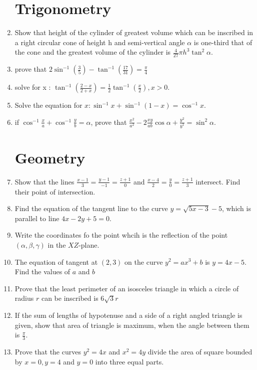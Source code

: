\documentclass[12pt,-letter paper]{article}
\theoremstyle{remark}
\providecommand{\brak}[1]{\ensuremath{\left(#1\right)}}
\begin{document}
\begin{enumerate}
            \section{Trigonometry}
      \item Show that height of the cylinder of greatest volume which can be inscribed in a right circular cone of height h and semi-vertical angle $\alpha$ is one-third that of the cone and the greatest volume of the cylinder is $\frac{4}{27} \pi h^3 \tan^2 \alpha$.
      \item prove that $2\sin^{-1}\brak{\frac{3}{5}}-\tan^{-1}\brak{\frac{17}{31}}=\frac{\pi}{4}$
      \item solve for x : $\tan^{-1}\brak{\frac{2-x}{2+x}}=\frac{1}{2} \tan^{-1}\brak{\frac{x}{2}},x>0$.

      \item Solve the equation for $x: \sin^{-1} x + \sin^{-1}\brak{1-x} = \cos^{-1}x$.
      \item if $\cos^{-1}\frac{x}{a} + \cos^{-1}\frac{y}{b} = \alpha$, prove that $\frac{x^2}{a^2} -2\frac{xy}{ab}\cos \alpha + \frac{y^2}{b^2} = \sin^2 \alpha$.
            \section{Geometry}
      \item Show that the lines $\frac{x-1}{3}= \frac{y-1}{-1} = \frac{z+1}{0}$ and $\frac{x-4}{2}= \frac{y}{0} = \frac{z+1}{3}$ intersect. Find their point of intersection.
      \item Find the equation of the tangent line to the curve $y=\sqrt{5x-3} -5$, which is parallel to line $4x-2y+5=0$.
      \item Write the coordinates fo the point whcih is the reflection of the point \brak{\alpha,\beta,\gamma} in the $XZ$-plane.
      \item The equation of tangent at \brak{2,3} on the curve $y^2 = ax^3 + b$ is $y = 4x -5$. Find the values of $a$ and $b$
      \item Prove that the least perimeter of an isosceles triangle in which a circle of radius $r$ can be inscribed is $6 \sqrt{3} r$
      \item If the sum of lengths of hypotenuse and a side of a right angled triangle is given, show that area of triangle is maximum, when the angle between them is $\frac{\pi}{3}$.
      \item Prove that the curves $y^2=4x$ and $x^2= 4y$ divide the area of square bounded by $x=0,y=4$ and $y=0$ into three equal parts.

\end{enumerate}
\end{document}
